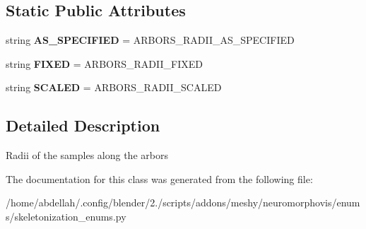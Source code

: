 \subsection*{Static Public Attributes}
\begin{DoxyCompactItemize}
\item 
string {\bfseries A\+S\+\_\+\+S\+P\+E\+C\+I\+F\+I\+ED} = \textquotesingle{}A\+R\+B\+O\+R\+S\+\_\+\+R\+A\+D\+I\+I\+\_\+\+A\+S\+\_\+\+S\+P\+E\+C\+I\+F\+I\+ED\textquotesingle{}\hypertarget{classmeshy_1_1neuromorphovis_1_1enums_1_1skeletonization__enums_1_1Skeletonization_1_1ArborsRadii_a9031f451faf0157751b29a4af36130fb}{}\label{classmeshy_1_1neuromorphovis_1_1enums_1_1skeletonization__enums_1_1Skeletonization_1_1ArborsRadii_a9031f451faf0157751b29a4af36130fb}

\item 
string {\bfseries F\+I\+X\+ED} = \textquotesingle{}A\+R\+B\+O\+R\+S\+\_\+\+R\+A\+D\+I\+I\+\_\+\+F\+I\+X\+ED\textquotesingle{}\hypertarget{classmeshy_1_1neuromorphovis_1_1enums_1_1skeletonization__enums_1_1Skeletonization_1_1ArborsRadii_a77db07bbc624b4cffcb85db10d56c38d}{}\label{classmeshy_1_1neuromorphovis_1_1enums_1_1skeletonization__enums_1_1Skeletonization_1_1ArborsRadii_a77db07bbc624b4cffcb85db10d56c38d}

\item 
string {\bfseries S\+C\+A\+L\+ED} = \textquotesingle{}A\+R\+B\+O\+R\+S\+\_\+\+R\+A\+D\+I\+I\+\_\+\+S\+C\+A\+L\+ED\textquotesingle{}\hypertarget{classmeshy_1_1neuromorphovis_1_1enums_1_1skeletonization__enums_1_1Skeletonization_1_1ArborsRadii_a5081ec21b78f3bd2fd78582ca74b33d2}{}\label{classmeshy_1_1neuromorphovis_1_1enums_1_1skeletonization__enums_1_1Skeletonization_1_1ArborsRadii_a5081ec21b78f3bd2fd78582ca74b33d2}

\end{DoxyCompactItemize}


\subsection{Detailed Description}


\begin{DoxyVerb}Radii of the samples along the arbors
\end{DoxyVerb}
 

The documentation for this class was generated from the following file\+:\begin{DoxyCompactItemize}
\item 
/home/abdellah/.\+config/blender/2./scripts/addons/meshy/neuromorphovis/enums/skeletonization\+\_\+enums.\+py\end{DoxyCompactItemize}
